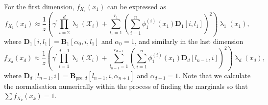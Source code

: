 For the first dimension, $f_{X_1}(x_1)$ can be expressed as
\begin{equation}
	f_{X_1}(x_1)  \approx \frac{1}{z} \left(\gamma^{\prime} \prod_{i=2}^{d} \uplambda_i(\mathcal{X}_i) + \sum_{l_1=1}^{r_1} \left(\sum_{i=1}^{n} \phi^{(i)}_1(x_1) \bm{D}_1[i, l_1] \right)^2 \right) \uplambda_1(x_1),
\end{equation}
where $\bm{D}_1[i, l_1] = \bm{B}_1[\alpha_0, i, l_1]$ and $\alpha_0 = 1$,
and similarly in the last dimension
\begin{equation}
	f_{X_d}(x_d)  \approx \frac{1}{z} \left(\gamma^{\prime} \prod_{i=1}^{d-1} \uplambda_i(\mathcal{X}_i) + \sum_{l_{n-1}=1}^{r_{d-1}} \left(\sum_{i=1}^{n} \phi^{(i)}_1(x_1) \bm{D}_d[l_{n-1},i] \right)^2 \right) \uplambda_d(x_d),
\end{equation}
where $\bm{D}_d[l_{n-1},i] = \bm{B}_{\text{pre},d}[l_{n-1}, i, \alpha_{n+1}]$ and $\alpha_{d+1} = 1$.
Note that we calculate the normalisation numerically within the process of finding the marginals so that $\sum f_{X_k}(x_k) = 1$.

%
%
%
%
%
%
%
%


